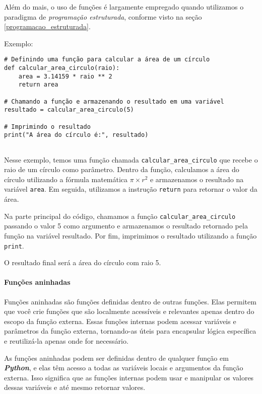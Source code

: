 \documentclass[a4paper, 12pt, onecolumn,singlespacing]{article}
\begin{document}
	Além do mais, o uso de funções é largamente empregado quando utilizamos o paradigma de \textit{programação estruturada}, conforme visto na seção \ref{programacao_estruturada}.
	
	Exemplo:
	
	\begin{verbatim}
# Definindo uma função para calcular a área de um círculo
def calcular_area_circulo(raio):
	area = 3.14159 * raio ** 2
	return area

# Chamando a função e armazenando o resultado em uma variável
resultado = calcular_area_circulo(5)

# Imprimindo o resultado
print("A área do círculo é:", resultado)
		
	\end{verbatim}

	Nesse exemplo, temos uma função chamada \texttt{calcular\_area\_circulo} que recebe o raio de um círculo como parâmetro. Dentro da função, calculamos a área do círculo utilizando a fórmula matemática $\pi \times r^2$ e armazenamos o resultado na variável \texttt{area}. Em seguida, utilizamos a instrução \texttt{return} para retornar o valor da área.
	
	Na parte principal do código, chamamos a função \texttt{calcular\_area\_circulo} passando o valor 5 como argumento e armazenamos o resultado retornado pela função na variável resultado. Por fim, imprimimos o resultado utilizando a função \texttt{print}.
	
	O resultado final será a área do círculo com raio 5.
	
	\paragraph{Funções aninhadas} \label{python_funcoes_aninhadas} Funções aninhadas são funções definidas dentro de outras funções. Elas permitem que você crie funções que são localmente acessíveis e relevantes apenas dentro do escopo da função externa. Essas funções internas podem acessar variáveis e parâmetros da função externa, tornando-as úteis para encapsular lógica específica e reutilizá-la apenas onde for necessário.
	
	As funções aninhadas podem ser definidas dentro de qualquer função em \textbf{\textit{Python}}, e elas têm acesso a todas as variáveis locais e argumentos da função externa. Isso significa que as funções internas podem usar e manipular os valores dessas variáveis e até mesmo retornar valores.
	
\end{document}
